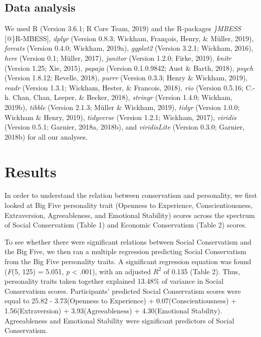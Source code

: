 \documentclass[man]{apa6}
\begin{document}
\subsection{Data analysis}\label{data-analysis}

We used R (Version 3.6.1; R Core Team, 2019) and the R-packages
\emph{\}MBESS} {[}@\}R-MBESS{]}, \emph{dplyr} (Version 0.8.3; Wickham,
François, Henry, \& Müller, 2019), \emph{forcats} (Version 0.4.0;
Wickham, 2019a), \emph{ggplot2} (Version 3.2.1; Wickham, 2016),
\emph{here} (Version 0.1; Müller, 2017), \emph{janitor} (Version 1.2.0;
Firke, 2019), \emph{knitr} (Version 1.25; Xie, 2015), \emph{papaja}
(Version 0.1.0.9842; Aust \& Barth, 2018), \emph{psych} (Version 1.8.12;
Revelle, 2018), \emph{purrr} (Version 0.3.3; Henry \& Wickham, 2019),
\emph{readr} (Version 1.3.1; Wickham, Hester, \& Francois, 2018),
\emph{rio} (Version 0.5.16; C.-h. Chan, Chan, Leeper, \& Becker, 2018),
\emph{stringr} (Version 1.4.0; Wickham, 2019b), \emph{tibble} (Version
2.1.3; Müller \& Wickham, 2019), \emph{tidyr} (Version 1.0.0; Wickham \&
Henry, 2019), \emph{tidyverse} (Version 1.2.1; Wickham, 2017),
\emph{viridis} (Version 0.5.1; Garnier, 2018a, 2018b), and
\emph{viridisLite} (Version 0.3.0; Garnier, 2018b) for all our analyses.

\section{Results}\label{results}

In order to understand the relation between conservatism and
personality, we first looked at Big Five personality trait (Openness to
Experience, Conscientiousness, Extraversion, Agreeableness, and
Emotional Stability) scores across the spectrum of Social Conservatism
(Table 1) and Economic Conservatism (Table 2) scores.

To see whether there were significant relations between Social
Conservatism and the Big Five, we then ran a multiple regression
predicting Social Conservatism from the Big Five personality traits. A
significant regression equation was found (\emph{F}(5, 125) = 5.051,
\emph{p} \textless{} .001), with an adjusted \(R^2\) of 0.135 (Table 2).
Thus, personality traits taken together explained 13.48\% of variance in
Social Conservatism scores. Participants' predicted Social Conservatism
scores were equal to 25.82 - 3.73(Openness to Experience) +
0.07(Conscientiousness) + 1.56(Extraversion) + 3.93(Agreeableness) +
4.30(Emotional Stability). Agreeableness and Emotional Stability were
significant predictors of Social Conservatism.
\end{document}
